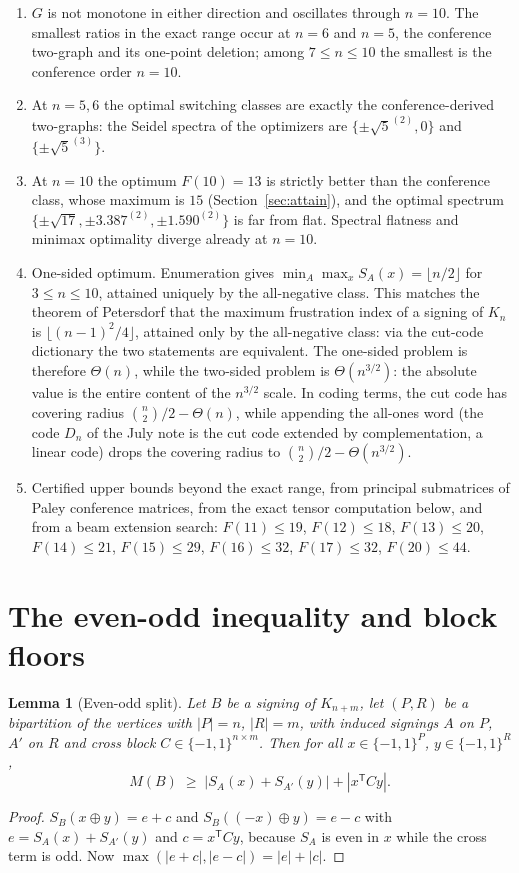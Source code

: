 \documentclass[11pt]{article}
\newtheorem{lemma}[theorem]{Lemma}
\theoremstyle{remark}
\newcommand{\eps}{\{-1,1\}}
\begin{document}
\begin{enumerate}
\item $G$ is not monotone in either direction and oscillates through
$n=10$. The smallest ratios in the exact range occur at $n=6$ and
$n=5$, the conference two-graph and its one-point deletion; among
$7\le n\le10$ the smallest is the conference order $n=10$.
\item At $n=5,6$ the optimal switching classes are exactly the
conference-derived two-graphs: the Seidel spectra of the optimizers
are $\{\pm\sqrt5^{(2)},0\}$ and $\{\pm\sqrt5^{(3)}\}$.
\item At $n=10$ the optimum $F(10)=13$ is strictly better than the
conference class, whose maximum is $15$ (Section~\ref{sec:attain}),
and the optimal spectrum $\{\pm\sqrt{17},\pm3.387^{(2)},\pm1.590^{(2)}\}$
is far from flat. Spectral flatness and minimax optimality diverge
already at $n=10$.
\item One-sided optimum. Enumeration gives
$\min_A\max_xS_A(x)=\lfloor n/2\rfloor$ for $3\le n\le10$, attained
uniquely by the all-negative class. This matches the theorem of
Petersdorf \cite{petersdorf} that the maximum frustration index of a
signing of $K_n$ is $\lfloor(n-1)^2/4\rfloor$, attained only by the
all-negative class: via the cut-code dictionary the two statements are
equivalent. The one-sided problem is therefore $\Theta(n)$, while the
two-sided problem is $\Theta(n^{3/2})$: the absolute value is the
entire content of the $n^{3/2}$ scale. In coding terms, the cut code
has covering radius $\binom n2/2-\Theta(n)$, while appending the
all-ones word (the code $D_n$ of the July note is the cut code
extended by complementation, a linear code) drops the covering radius
to $\binom n2/2-\Theta(n^{3/2})$.
\item Certified upper bounds beyond the exact range, from principal
submatrices of Paley conference matrices, from the exact tensor
computation below, and from a beam extension search:
$F(11)\le19$, $F(12)\le18$, $F(13)\le20$, $F(14)\le21$, $F(15)\le29$,
$F(16)\le32$, $F(17)\le32$, $F(20)\le44$.
\end{enumerate}

\section{The even-odd inequality and block floors}\label{sec:evenodd}

\begin{lemma}[Even-odd split]\label{lem:evenodd}
Let $B$ be a signing of $K_{n+m}$, let $(P,R)$ be a bipartition of the
vertices with $|P|=n$, $|R|=m$, with induced signings $A$ on $P$, $A'$
on $R$ and cross block $C\in\eps^{n\times m}$. Then for all
$x\in\eps^P$, $y\in\eps^R$,
\[
 M(B)\;\ge\;|S_A(x)+S_{A'}(y)|+|x^{\mathsf T}Cy|.
\]
\end{lemma}
\begin{proof}
$S_B(x\oplus y)=e+c$ and $S_B((-x)\oplus y)=e-c$ with
$e=S_A(x)+S_{A'}(y)$ and $c=x^{\mathsf T}Cy$, because $S_A$ is even in
$x$ while the cross term is odd. Now
$\max(|e+c|,|e-c|)=|e|+|c|$.
\end{proof}
\end{document}
